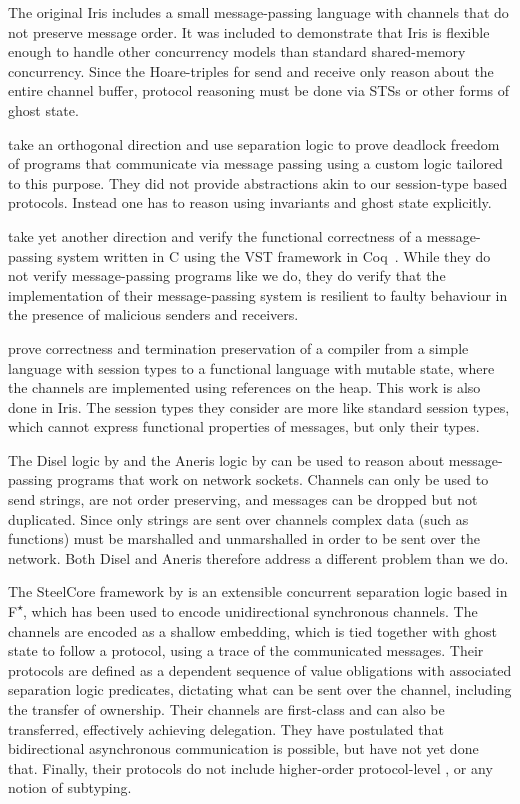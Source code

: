 The original Iris \cite{jung-POPL2015} includes a small
message-passing language with
channels that do not preserve message order.
It was included to demonstrate that Iris is flexible enough to handle other
concurrency models than standard shared-memory concurrency.
Since the Hoare-triples for send and receive only reason about
the entire channel buffer, protocol reasoning
must be done via STSs or other forms of ghost state.

\citet{hamin-ECOOP2019} take an orthogonal direction and use separation
logic to prove deadlock freedom of programs that communicate via
message passing using a custom logic tailored to this purpose.
They did not provide abstractions akin to our session-type based protocols.
Instead one has to reason using invariants and ghost state explicitly.

\citet{mansky-OOPSLA2017} take yet another direction and verify the functional
correctness of a message-passing system written in C using the VST framework
in Coq~\cite{appel2014vst}.
While they do not verify message-passing programs
like we do, they do verify that the implementation of their message-passing
system is resilient to faulty behaviour in the presence of malicious senders
and receivers.

\citet{tassarotti-ESOP2017} prove correctness
and termination preservation of a compiler from a simple language with session
types to a functional language with mutable state, where the channels are
implemented using references on the heap.
This work is also done in Iris.
The session types they consider are more like standard session types, which
cannot express functional properties of messages, but only their types.

The Disel logic by \citet{sergey-POPL2018} and the Aneris logic
by \citet{krogh-jespersen} can be used to reason about message-passing programs
that work on network sockets.
Channels can only be used to send strings, are not order preserving, and
messages can be dropped but not duplicated.
Since only strings are sent over channels complex data (such as functions) must
be marshalled and unmarshalled in order to be sent over the network.
Both Disel and Aneris therefore address a different problem than we do.

The SteelCore framework by \cite{DBLP:journals/pacmpl/SwamyRFMAM20} is an
extensible concurrent separation logic based in F\textsuperscript{$\star$},
which has been used to encode unidirectional synchronous channels.
The channels are encoded as a shallow embedding,
which is tied together with ghost state to follow a protocol, using a trace of
the communicated messages.
Their protocols are defined as a dependent sequence of value obligations with
associated separation logic predicates, dictating what can be sent over the channel,
including the transfer of ownership.
Their channels are first-class and can also be transferred, effectively
achieving delegation.
They have postulated that bidirectional asynchronous communication is possible,
but have not yet done that.
Finally, their protocols do not include higher-order protocol-level \binders,
or any notion of subtyping.

